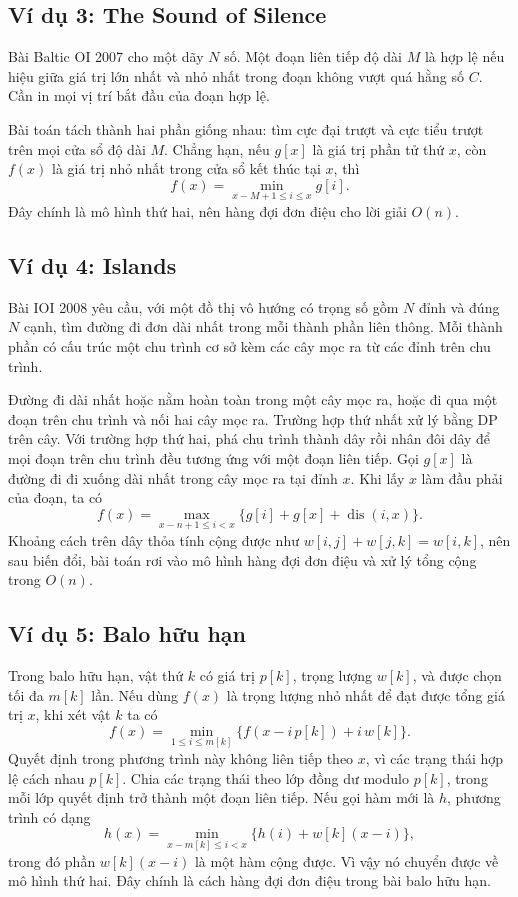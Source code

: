 \documentclass[11pt]{article}
\begin{document}
\subsection{Ví dụ 3: The Sound of Silence}

Bài Baltic OI 2007 cho một dãy $N$ số. Một đoạn liên tiếp độ dài $M$ là hợp
lệ nếu hiệu giữa giá trị lớn nhất và nhỏ nhất trong đoạn không vượt quá hằng
số $C$. Cần in mọi vị trí bắt đầu của đoạn hợp lệ.

Bài toán tách thành hai phần giống nhau: tìm cực đại trượt và cực tiểu trượt
trên mọi cửa sổ độ dài $M$. Chẳng hạn, nếu $g[x]$ là giá trị phần tử thứ
$x$, còn $f(x)$ là giá trị nhỏ nhất trong cửa sổ kết thúc tại $x$, thì
\[
  f(x)=\min_{x-M+1\le i\le x} g[i].
\]
Đây chính là mô hình thứ hai, nên hàng đợi đơn điệu cho lời giải $O(n)$.

\subsection{Ví dụ 4: Islands}

Bài IOI 2008 yêu cầu, với một đồ thị vô hướng có trọng số gồm $N$ đỉnh và
đúng $N$ cạnh, tìm đường đi đơn dài nhất trong mỗi thành phần liên thông. Mỗi
thành phần có cấu trúc một chu trình cơ sở kèm các cây mọc ra từ các đỉnh
trên chu trình.

Đường đi dài nhất hoặc nằm hoàn toàn trong một cây mọc ra, hoặc đi qua một
đoạn trên chu trình và nối hai cây mọc ra. Trường hợp thứ nhất xử lý bằng DP
trên cây. Với trường hợp thứ hai, phá chu trình thành dây rồi nhân đôi dây
để mọi đoạn trên chu trình đều tương ứng với một đoạn liên tiếp. Gọi $g[x]$
là đường đi đi xuống dài nhất trong cây mọc ra tại đỉnh $x$. Khi lấy $x$ làm
đầu phải của đoạn, ta có
\[
  f(x)=\max_{x-n+1\le i<x}\{g[i]+g[x]+\operatorname{dis}(i,x)\}.
\]
Khoảng cách trên dây thỏa tính cộng được như $w[i,j]+w[j,k]=w[i,k]$, nên sau
biến đổi, bài toán rơi vào mô hình hàng đợi đơn điệu và xử lý tổng cộng trong
$O(n)$.

\subsection{Ví dụ 5: Balo hữu hạn}

Trong balo hữu hạn, vật thứ $k$ có giá trị $p[k]$, trọng lượng $w[k]$, và
được chọn tối đa $m[k]$ lần. Nếu dùng $f(x)$ là trọng lượng nhỏ nhất để đạt
được tổng giá trị $x$, khi xét vật $k$ ta có
\[
  f(x)=\min_{1\le i\le m[k]}
       \{f(x-i\,p[k])+i\,w[k]\}.
\]
Quyết định trong phương trình này không liên tiếp theo $x$, vì các trạng thái
hợp lệ cách nhau $p[k]$. Chia các trạng thái theo lớp đồng dư modulo $p[k]$,
trong mỗi lớp quyết định trở thành một đoạn liên tiếp. Nếu gọi hàm mới là
$h$, phương trình có dạng
\[
  h(x)=\min_{x-m[k]\le i<x}
       \{h(i)+w[k](x-i)\},
\]
trong đó phần $w[k](x-i)$ là một hàm cộng được. Vì vậy nó chuyển được về mô
hình thứ hai. Đây chính là cách hàng đợi đơn điệu trong bài balo hữu hạn.
\end{document}
